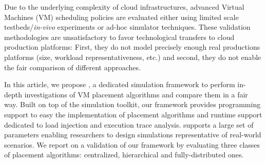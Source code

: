 

 Due to the underlying complexity of cloud infrastructures, advanced
 Virtual Machines (VM) scheduling policies are evaluated either using limited scale testbeds/\emph{in-vivo}
experiments or ad-hoc simulator techniques. These validation
methodologies are unsatisfactory to favor technological transfers to
cloud production platforms: First, they
do not model precisely enough real productions platforms (size,
workload representativeness, etc.) and second, they do not enable the
fair comparison of different approaches.

In this article, we propose \vmps, a dedicated simulation framework to
perform in-depth investigations of VM placement algorithms and compare
them in a fair way. Built on top of the \sg simulation toolkit, our
framework provides programming support to easy the implementation of
placement algorithms and runtime support dedicated to load injection
and execution trace analysis.
\vmps supports a large set of parameters enabling researchers to design simulations representative of
real-world scenarios.
We report on a validation
of our framework by evaluating three classes of placement algorithms:
centralized, hierarchical and fully-distributed ones.
